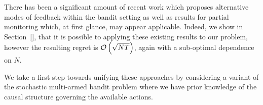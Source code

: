 There has been a significant amount of recent work which proposes alternative modes of feedback within the bandit setting \cite{TODO} as well as results for partial monitoring which, at first glance, may appear applicable. Indeed, we show in Section~\ref{}, that it is possible to applying these existing results to our problem, however the resulting regret is $\mathcal{O}\left( \sqrt{NT} \right)$, again with a sub-optimal dependence on $N$.





We take a first step towards unifying these approaches by considering a variant of the stochastic multi-armed bandit problem where we have prior knowledge of the causal structure governing the available actions. 




